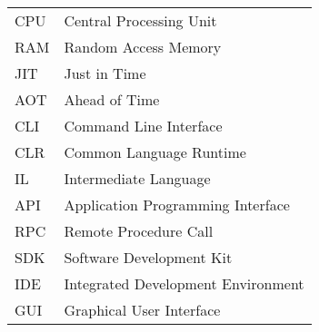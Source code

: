 
\seznamzkr

\begin{tabular}{ll}
CPU & Central Processing Unit \\
RAM & Random Access Memory \\
JIT & Just in Time \\
AOT & Ahead of Time \\
CLI & Command Line Interface \\
CLR & Common Language Runtime \\
IL & Intermediate Language \\
API & Application Programming Interface \\
RPC & Remote Procedure Call \\
SDK & Software Development Kit \\
IDE & Integrated Development Environment \\
GUI & Graphical User Interface \\
\end{tabular}

